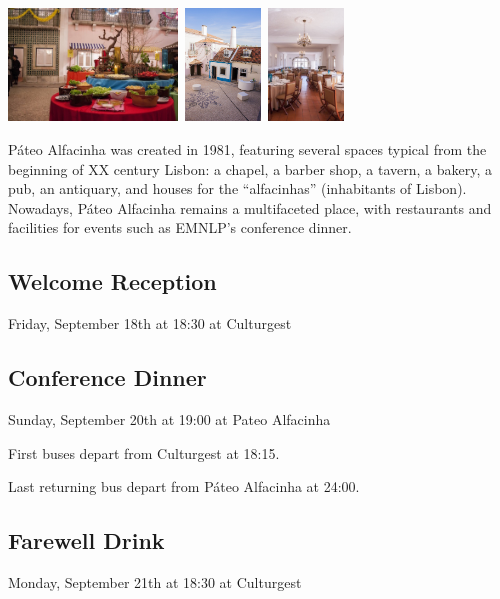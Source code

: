 \begin{center}
\includegraphics[height=3cm]{content/images-web/dinner-pateo-jantar-arraial}\ \includegraphics[height=3cm]{content/images-web/dinner-pateo-exterior}\ \includegraphics[height=3cm]{content/images-web/dinner-pateo-sala}
\par\end{center}

Páteo Alfacinha was created in 1981, featuring several spaces typical
from the beginning of XX century Lisbon: a chapel, a barber shop,
a tavern, a bakery, a pub, an antiquary, and houses for the “alfacinhas”
(inhabitants of Lisbon). Nowadays, Páteo Alfacinha remains a multifaceted
place, with restaurants and facilities for events such as EMNLP's
conference dinner.


\subsection*{Welcome Reception}

Friday, September 18th at 18:30 at Culturgest


\subsection*{Conference Dinner}

Sunday, September 20th at 19:00 at Pateo Alfacinha

First buses depart from Culturgest at 18:15. 

Last returning bus depart from Páteo Alfacinha at 24:00.


\subsection*{Farewell Drink}

Monday, September 21th at 18:30 at Culturgest
